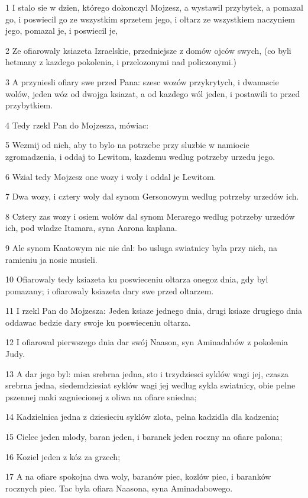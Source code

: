 \par 1 I stalo sie w dzien, którego dokonczyl Mojzesz, a wystawil przybytek, a pomazal go, i poswiecil go ze wszystkim sprzetem jego, i oltarz ze wszystkiem naczyniem jego, pomazal je, i poswiecil je,
\par 2 Ze ofiarowaly ksiazeta Izraelskie, przedniejsze z domów ojców swych, (co byli hetmany z kazdego pokolenia, i przelozonymi nad policzonymi.)
\par 3 A przyniesli ofiary swe przed Pana: szesc wozów przykrytych, i dwanascie wolów, jeden wóz od dwojga ksiazat, a od kazdego wól jeden, i postawili to przed przybytkiem.
\par 4 Tedy rzekl Pan do Mojzesza, mówiac:
\par 5 Wezmij od nich, aby to bylo na potrzebe przy sluzbie w namiocie zgromadzenia, i oddaj to Lewitom, kazdemu wedlug potrzeby urzedu jego.
\par 6 Wzial tedy Mojzesz one wozy i woly i oddal je Lewitom.
\par 7 Dwa wozy, i cztery woly dal synom Gersonowym wedlug potrzeby urzedów ich.
\par 8 Cztery zas wozy i osiem wolów dal synom Merarego wedlug potrzeby urzedów ich, pod wladze Itamara, syna Aarona kaplana.
\par 9 Ale synom Kaatowym nic nie dal: bo usluga swiatnicy byla przy nich, na ramieniu ja nosic musieli.
\par 10 Ofiarowaly tedy ksiazeta ku poswieceniu oltarza onegoz dnia, gdy byl pomazany; i ofiarowaly ksiazeta dary swe przed oltarzem.
\par 11 I rzekl Pan do Mojzesza: Jeden ksiaze jednego dnia, drugi ksiaze drugiego dnia oddawac bedzie dary swoje ku poswieceniu oltarza.
\par 12 I ofiarowal pierwszego dnia dar swój Naason, syn Aminadabów z pokolenia Judy.
\par 13 A dar jego byl: misa srebrna jedna, sto i trzydziesci syklów wagi jej, czasza srebrna jedna, siedemdziesiat syklów wagi jej wedlug sykla swiatnicy, obie pelne pszennej maki zagniecionej z oliwa na ofiare sniedna;
\par 14 Kadzielnica jedna z dziesieciu syklów zlota, pelna kadzidla dla kadzenia;
\par 15 Cielec jeden mlody, baran jeden, i baranek jeden roczny na ofiare palona;
\par 16 Koziel jeden z kóz za grzech;
\par 17 A na ofiare spokojna dwa woly, baranów piec, kozlów piec, i baranków rocznych piec. Tac byla ofiara Naasona, syna Aminadabowego.

